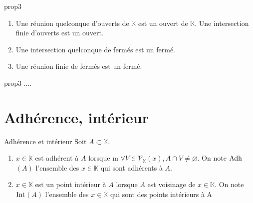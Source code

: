\documentclass[12pt,a4paper]{report}
\begin{document}
\begin{proposition}{}{prop3}
\begin{enumerate}
\item Une réunion quelconque d'ouverts de $\mathbb{K}$ est un ouvert de $\mathbb{K}$.
\newline Une intersection finie d'ouverts est un ouvert.
\item Une intersection quelconque de fermés est un fermé.
\item Une réunion finie de fermés est un fermé.
\end{enumerate}
\end{proposition}

\begin{principedemo}{prop3}
....
\end{principedemo}

\section{Adhérence, intérieur}

\begin{definition}{Adhérence et intérieur}{}
Soit $A \subset \mathbb{K}$.
\begin{enumerate}
\item $x \in \mathbb{K}$ est adhérent à $A$ lorsque m $\forall V \in \mathcal{V}_\mathbb{K}(x), A \cap V \neq \varnothing$.
\newline On note $\rm{Adh}$$(A)$ l'ensemble des $x \in \mathbb{K}$ qui sont adhérents à $A$.
\item $x \in \mathbb{K}$ est un point intérieur à $A$ lorsque $A$ est voisinage de $x \in \mathbb{K}$.
\newline On note $\rm{Int}$$(A)$ l'ensemble des $x \in \mathbb{K}$ qui sont des points intérieurs à A
\end{enumerate}
\end{definition}
\end{document}
